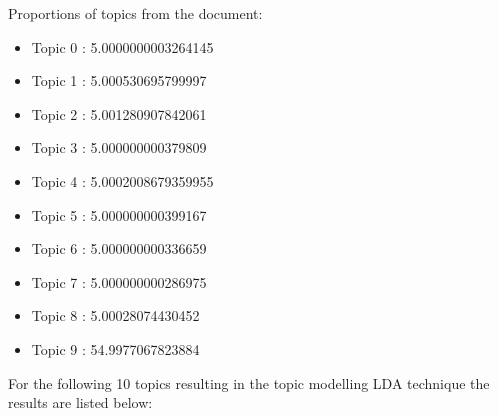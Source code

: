 Proportions of topics from the document:\\
\begin{itemize}
    \item Topic  0 :  5.0000000003264145 %
\end{itemize}
\begin{itemize}
    \item Topic  1 :  5.000530695799997 %
\end{itemize}
\begin{itemize}
    \item Topic  2 :  5.001280907842061 %
\end{itemize}
\begin{itemize}
    \item Topic  3 :  5.000000000379809 %
\end{itemize}
\begin{itemize}
    \item Topic  4 :  5.0002008679359955 %
\end{itemize}
\begin{itemize}
    \item Topic  5 :  5.000000000399167 %
\end{itemize}
\begin{itemize}
    \item Topic  6 :  5.000000000336659 %
\end{itemize}
\begin{itemize}
    \item Topic  7 :  5.000000000286975 %
\end{itemize}
\begin{itemize}
    \item Topic  8 :  5.00028074430452 %
\end{itemize}
\begin{itemize}
    \item Topic  9 :  54.9977067823884 %
\end{itemize}

For the following 10 topics resulting in the topic modelling LDA technique the results are listed below:


